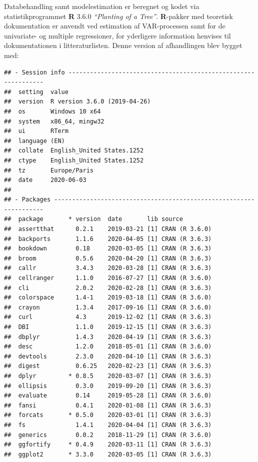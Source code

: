 \documentclass[
  a4paper,
  oneside]{memoir}
\begin{document}
Databehandling samt modelestimation er beregnet og kodet via statistikprogrammet \textbf{R} 3.6.0 \emph{``Planting of a Tree''}. \textbf{R}-pakker med teoretisk dokumentation er anvendt ved estimation af VAR-processen samt for de univariate- og multiple regressioner, for yderligere information henvises til dokumentationen i litteraturlisten. Denne version af afhandlingen blev bygget med:

\begin{verbatim}
## - Session info ---------------------------------------------------------------
##  setting  value                       
##  version  R version 3.6.0 (2019-04-26)
##  os       Windows 10 x64              
##  system   x86_64, mingw32             
##  ui       RTerm                       
##  language (EN)                        
##  collate  English_United States.1252  
##  ctype    English_United States.1252  
##  tz       Europe/Paris                
##  date     2020-06-03                  
## 
## - Packages -------------------------------------------------------------------
##  package       * version  date       lib source           
##  assertthat      0.2.1    2019-03-21 [1] CRAN (R 3.6.0)   
##  backports       1.1.6    2020-04-05 [1] CRAN (R 3.6.3)   
##  bookdown        0.18     2020-03-05 [1] CRAN (R 3.6.3)   
##  broom           0.5.6    2020-04-20 [1] CRAN (R 3.6.3)   
##  callr           3.4.3    2020-03-28 [1] CRAN (R 3.6.3)   
##  cellranger      1.1.0    2016-07-27 [1] CRAN (R 3.6.0)   
##  cli             2.0.2    2020-02-28 [1] CRAN (R 3.6.3)   
##  colorspace      1.4-1    2019-03-18 [1] CRAN (R 3.6.0)   
##  crayon          1.3.4    2017-09-16 [1] CRAN (R 3.6.0)   
##  curl            4.3      2019-12-02 [1] CRAN (R 3.6.3)   
##  DBI             1.1.0    2019-12-15 [1] CRAN (R 3.6.3)   
##  dbplyr          1.4.3    2020-04-19 [1] CRAN (R 3.6.3)   
##  desc            1.2.0    2018-05-01 [1] CRAN (R 3.6.0)   
##  devtools        2.3.0    2020-04-10 [1] CRAN (R 3.6.3)   
##  digest          0.6.25   2020-02-23 [1] CRAN (R 3.6.3)   
##  dplyr         * 0.8.5    2020-03-07 [1] CRAN (R 3.6.3)   
##  ellipsis        0.3.0    2019-09-20 [1] CRAN (R 3.6.3)   
##  evaluate        0.14     2019-05-28 [1] CRAN (R 3.6.0)   
##  fansi           0.4.1    2020-01-08 [1] CRAN (R 3.6.3)   
##  forcats       * 0.5.0    2020-03-01 [1] CRAN (R 3.6.3)   
##  fs              1.4.1    2020-04-04 [1] CRAN (R 3.6.3)   
##  generics        0.0.2    2018-11-29 [1] CRAN (R 3.6.0)   
##  ggfortify     * 0.4.9    2020-03-11 [1] CRAN (R 3.6.3)   
##  ggplot2       * 3.3.0    2020-03-05 [1] CRAN (R 3.6.3)   

\end{verbatim}
\end{document}
